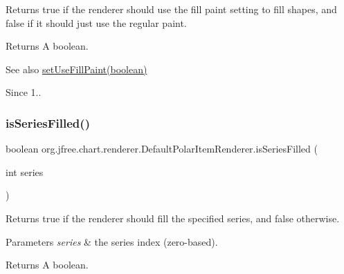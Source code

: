 Returns {\ttfamily true} if the renderer should use the fill paint setting to fill shapes, and {\ttfamily false} if it should just use the regular paint.

\begin{DoxyReturn}{Returns}
A boolean.
\end{DoxyReturn}
\begin{DoxySeeAlso}{See also}
\mbox{\hyperlink{classorg_1_1jfree_1_1chart_1_1renderer_1_1_default_polar_item_renderer_a06d38abcaf202f22bf90deae6d93d3bb}{set\+Use\+Fill\+Paint(boolean)}} 
\end{DoxySeeAlso}
\begin{DoxySince}{Since}
1.. 
\end{DoxySince}
\mbox{\label{classorg_1_1jfree_1_1chart_1_1renderer_1_1_default_polar_item_renderer_af0195e7c164a283bb10399c454cea1bb}} 
\subsubsection{\texorpdfstring{is\+Series\+Filled()}{isSeriesFilled()}}
{\footnotesize\ttfamily boolean org.\+jfree.\+chart.\+renderer.\+Default\+Polar\+Item\+Renderer.\+is\+Series\+Filled (\begin{DoxyParamCaption}\item[{int}]{series }\end{DoxyParamCaption})}

Returns {\ttfamily true} if the renderer should fill the specified series, and {\ttfamily false} otherwise.


\begin{DoxyParams}{Parameters}
{\em series} & the series index (zero-\/based).\\
\hline
\end{DoxyParams}
\begin{DoxyReturn}{Returns}
A boolean. 
\end{DoxyReturn}
\mbox{\label{classorg_1_1jfree_1_1chart_1_1renderer_1_1_default_polar_item_renderer_a57bdfb049e0c886624471fe2167fba2e}} 
